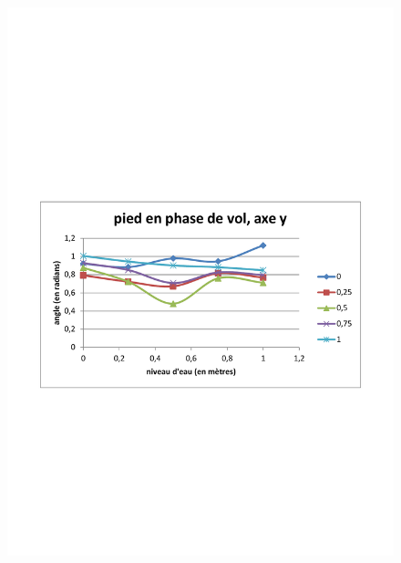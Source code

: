 \documentclass[runningheads,a4paper]{llncs}
\begin{document}
\begin{figure}[h]
\includegraphics[scale=0.3]{traj_pts_clefs/swing_foot_y.pdf}

\end{figure}
\end{document}
